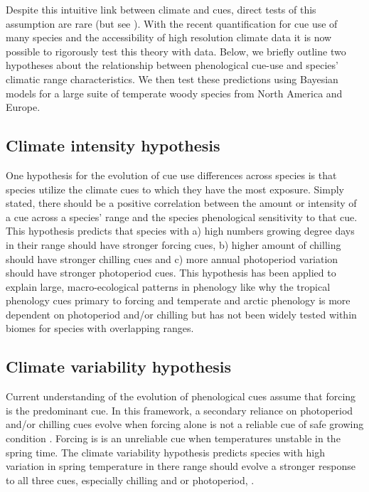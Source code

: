 \documentclass[12pt]{article}\usepackage[]{graphicx}\usepackage[]{color}
\begin{document}
Despite this intuitive link between climate and cues, direct tests of this assumption are rare (but see \citep{Zohner:2017aa}). With the recent quantification for cue use of many species \citep{Ettinger:2020aa} and the accessibility of high resolution climate data it is now possible to rigorously test this theory with data. Below, we briefly outline two hypotheses about the relationship between phenological cue-use and species' climatic range characteristics. We then test these predictions using Bayesian models for a large suite of temperate woody species from North America and Europe.

\subsection{Climate intensity hypothesis}
One hypothesis for the evolution of cue use differences across species is that species utilize the climate cues to which they have the most exposure. Simply stated, there should be a positive correlation between the amount or intensity of a cue across a species' range and the species phenological sensitivity to that cue. This hypothesis predicts that species with  a) high numbers growing degree days in their range should have stronger forcing cues, b) higher amount of chilling should have stronger chilling cues and c) more annual photoperiod variation should have stronger photoperiod cues. This hypothesis has been applied to explain large, macro-ecological patterns in phenology like why the tropical phenology cues primary to forcing and temperate and arctic phenology is more dependent on photoperiod and/or chilling \citep{} but has not been widely tested within biomes for species with overlapping ranges.  

\subsection{Climate variability hypothesis}

Current understanding of the evolution of phenological cues assume that forcing is the predominant cue. In this framework, a secondary reliance on photoperiod and/or chilling cues evolve when forcing alone is not a reliable cue of safe growing condition \citep{Korner:2010aa}. Forcing is is an unreliable cue when temperatures unstable in the spring time. The climate variability hypothesis predicts species with high variation in spring temperature in there range should evolve a stronger response to all three cues, especially chilling and or photoperiod,  \citep{Wang:2014aa, Muffler2016}. %
\end{document}

